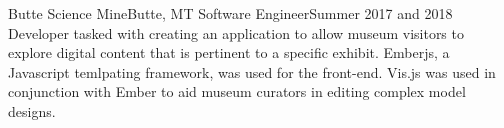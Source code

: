 

\experienceHeading
{Butte Science Mine}{Butte, MT}
{Software Engineer}{Summer 2017 and 2018}
\experienceStart
        {Developer tasked with creating an application to allow museum visitors to explore digital content that is pertinent to a specific exhibit.}
        {Emberjs, a Javascript temlpating framework, was used for the front-end.}
        {Vis.js was used in conjunction with Ember to aid museum curators in editing complex model designs.}
\experienceEnd